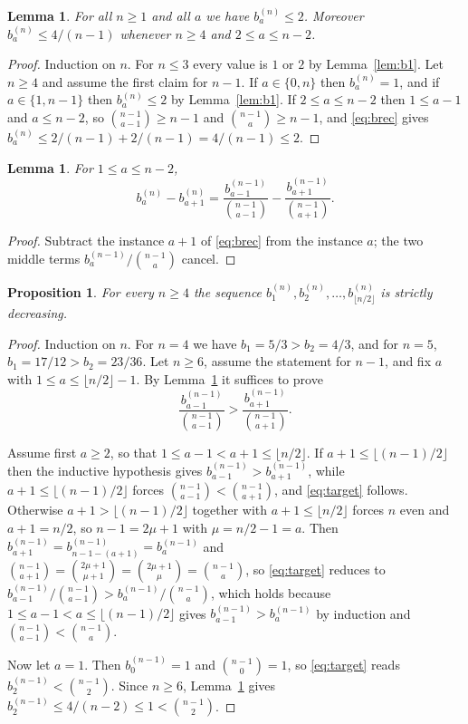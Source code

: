 \documentclass[11pt]{article}
\newtheorem{proposition}[theorem]{Proposition}
\newtheorem{lemma}[theorem]{Lemma}
\theoremstyle{definition}
\newcommand{\bin}[2]{\binom{#1}{#2}}
\begin{document}
\begin{lemma}\label{lem:bbound}
For all $n\ge1$ and all $a$ we have $b^{(n)}_a\le 2$. Moreover $b^{(n)}_a\le 4/(n-1)$ whenever $n\ge4$ and $2\le a\le n-2$.
\end{lemma}

\begin{proof}
Induction on $n$. For $n\le 3$ every value is $1$ or $2$ by Lemma~\ref{lem:b1}. Let $n\ge4$ and assume the first claim for $n-1$. If $a\in\{0,n\}$ then $b^{(n)}_a=1$, and if $a\in\{1,n-1\}$ then $b^{(n)}_a\le2$ by Lemma~\ref{lem:b1}. If $2\le a\le n-2$ then $1\le a-1$ and $a\le n-2$, so $\bin{n-1}{a-1}\ge n-1$ and $\bin{n-1}{a}\ge n-1$, and \eqref{eq:brec} gives $b^{(n)}_a\le 2/(n-1)+2/(n-1)=4/(n-1)\le 2$.
\end{proof}

\begin{lemma}\label{lem:diff}
For $1\le a\le n-2$,
\[
b^{(n)}_a-b^{(n)}_{a+1}=\frac{b^{(n-1)}_{a-1}}{\bin{n-1}{a-1}}-\frac{b^{(n-1)}_{a+1}}{\bin{n-1}{a+1}} .
\]
\end{lemma}

\begin{proof}
Subtract the instance $a+1$ of \eqref{eq:brec} from the instance $a$; the two middle terms $b^{(n-1)}_{a}/\bin{n-1}{a}$ cancel.
\end{proof}

\begin{proposition}\label{prop:mono}
For every $n\ge 4$ the sequence $b^{(n)}_1,b^{(n)}_2,\dots,b^{(n)}_{\lfloor n/2\rfloor}$ is strictly decreasing.
\end{proposition}

\begin{proof}
Induction on $n$. For $n=4$ we have $b_1=5/3>b_2=4/3$, and for $n=5$, $b_1=17/12>b_2=23/36$. Let $n\ge 6$, assume the statement for $n-1$, and fix $a$ with $1\le a\le \lfloor n/2\rfloor-1$. By Lemma~\ref{lem:diff} it suffices to prove
\begin{equation}\label{eq:target}
\frac{b^{(n-1)}_{a-1}}{\bin{n-1}{a-1}}>\frac{b^{(n-1)}_{a+1}}{\bin{n-1}{a+1}} .
\end{equation}

Assume first $a\ge2$, so that $1\le a-1<a+1\le\lfloor n/2\rfloor$. If $a+1\le\lfloor (n-1)/2\rfloor$ then the inductive hypothesis gives $b^{(n-1)}_{a-1}>b^{(n-1)}_{a+1}$, while $a+1\le\lfloor (n-1)/2\rfloor$ forces $\bin{n-1}{a-1}<\bin{n-1}{a+1}$, and \eqref{eq:target} follows. Otherwise $a+1>\lfloor (n-1)/2\rfloor$ together with $a+1\le\lfloor n/2\rfloor$ forces $n$ even and $a+1=n/2$, so $n-1=2\mu+1$ with $\mu=n/2-1=a$. Then $b^{(n-1)}_{a+1}=b^{(n-1)}_{n-1-(a+1)}=b^{(n-1)}_{a}$ and $\bin{n-1}{a+1}=\bin{2\mu+1}{\mu+1}=\bin{2\mu+1}{\mu}=\bin{n-1}{a}$, so \eqref{eq:target} reduces to $b^{(n-1)}_{a-1}/\bin{n-1}{a-1}>b^{(n-1)}_{a}/\bin{n-1}{a}$, which holds because $1\le a-1<a\le \lfloor (n-1)/2\rfloor$ gives $b^{(n-1)}_{a-1}>b^{(n-1)}_{a}$ by induction and $\bin{n-1}{a-1}<\bin{n-1}{a}$.

Now let $a=1$. Then $b^{(n-1)}_{0}=1$ and $\bin{n-1}{0}=1$, so \eqref{eq:target} reads $b^{(n-1)}_{2}<\bin{n-1}{2}$. Since $n\ge6$, Lemma~\ref{lem:bbound} gives $b^{(n-1)}_2\le 4/(n-2)\le1<\bin{n-1}{2}$.
\end{proof}
\end{document}
